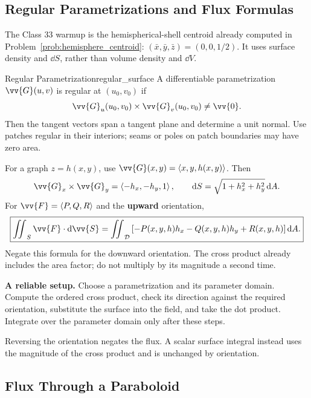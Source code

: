 \newpage
\subsection{Regular Parametrizations and Flux Formulas}

The Class 33 warmup is the hemispherical-shell centroid already computed in Problem~\ref{prob:hemisphere_centroid}: $\boxed{(\bar{x},\bar{y},\bar{z}) = (0,0,1/2)}$.
It uses surface density and $\dd{S}$, rather than volume density and $\dd{V}$.

\begin{definition}{Regular Parametrization}{regular_surface}
A differentiable parametrization $\vv{G}(u,v)$ is regular at $(u_0,v_0)$ if
\[
    \vv{G}_u(u_0,v_0) \times \vv{G}_v(u_0,v_0) \ne \vv{0}.
\]
Then the tangent vectors span a tangent plane and determine a unit normal.
Use patches regular in their interiors; seams or poles on patch boundaries may have zero area.
\end{definition}

For a graph $z = h(x,y)$, use $\vv{G}(x,y) = \ang{x,y,h(x,y)}$. Then
\[
    \vv{G}_x \times \vv{G}_y = \ang{-h_x,-h_y,1},\qquad
    \dd{S} = \sqrt{1 + h_x^2 + h_y^2}\,\dd{A}.
\]
For $\vv{F} = \ang{P,Q,R}$ and the \textbf{upward} orientation,
\[
    \boxed{\iint_S \vv{F}\cdot\dd{\vv{S}}
    = \iint_{\mathcal{D}}\left[-P(x,y,h)h_x - Q(x,y,h)h_y + R(x,y,h)\right]\dd{A}.}
\]
Negate this formula for the downward orientation. The cross product already includes the area factor; do not multiply by its magnitude a second time.

\textbf{A reliable setup.}
Choose a parametrization and its parameter domain. Compute the ordered cross product, check its direction against the required orientation, substitute the surface into the field, and take the dot product. Integrate over the parameter domain only after these steps.

Reversing the orientation negates the flux. A scalar surface integral instead uses the magnitude of the cross product and is unchanged by orientation.

\newpage
\subsection{Flux Through a Paraboloid}

